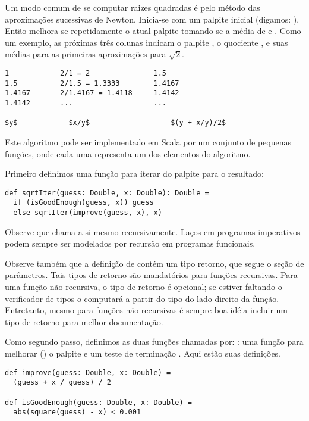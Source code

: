 Um modo comum de se computar raizes quadradas \'{e} pelo m\'{e}todo das aproxima\c{c}\~{o}es
sucessivas de Newton. Inicia-se com um palpite inicial  (digamos:
). Ent\~{a}o melhora-se repetidamente o atual palpite  
tomando-se a m\'{e}dia de  e . Como um exemplo, as pr\'{o}ximas
tr\^{e}s colunas indicam o palpite , o quociente , e suas
m\'{e}dias para as primeiras aproxima\c{c}\~{o}es para 
$\sqrt 2$.       

\begin{lstlisting}
1            2/1 = 2               1.5
1.5          2/1.5 = 1.3333        1.4167
1.4167       2/1.4167 = 1.4118     1.4142
1.4142       ...                   ...

$y$            $x/y$                   $(y + x/y)/2$
\end{lstlisting}

Este algoritmo pode ser implementado em Scala por um conjunto de pequenas fun\c{c}\~{o}es,
onde cada uma representa um dos elementos do algoritmo.

Primeiro definimos uma fun\c{c}\~{a}o para iterar do palpite para o resultado:

\begin{lstlisting}
def sqrtIter(guess: Double, x: Double): Double =
  if (isGoodEnough(guess, x)) guess
  else sqrtIter(improve(guess, x), x)
\end{lstlisting}

Observe que  chama a si mesmo recursivamente. La\c{c}os em 
programas imperativos podem sempre ser modelados por recurs\~{a}o em 
programas funcionais. 

Observe tamb\'{e}m que a defini\c{c}\~{a}o de  cont\'{e}m um tipo retorno,
que segue o se\c{c}\~{a}o de par\^{a}metros. Tais tipos de retorno s\~{a}o mandat\'{o}rios para 
fun\c{c}\~{o}es recursivas. Para uma fun\c{c}\~{a}o n\~{a}o recursiva, o tipo de retorno \'{e} opcional;
se estiver faltando o verificador de tipos o computar\'{a} a partir do tipo do lado
direito da fun\c{c}\~{a}o. Entretanto, mesmo para fun\c{c}\~{o}es n\~{a}o recursivas \'{e} sempre boa id\'{e}ia 
incluir um tipo de retorno para melhor documenta\c{c}\~{a}o.  

Como segundo passo, definimos as duas fun\c{c}\~{o}es chamadas por:
: uma fun\c{c}\~{a}o para melhorar () o palpite e um
teste de termina\c{c}\~{a}o . Aqui est\~{a}o suas defini\c{c}\~{o}es.
\begin{lstlisting}
def improve(guess: Double, x: Double) =
  (guess + x / guess) / 2    

def isGoodEnough(guess: Double, x: Double) =
  abs(square(guess) - x) < 0.001
\end{lstlisting}


